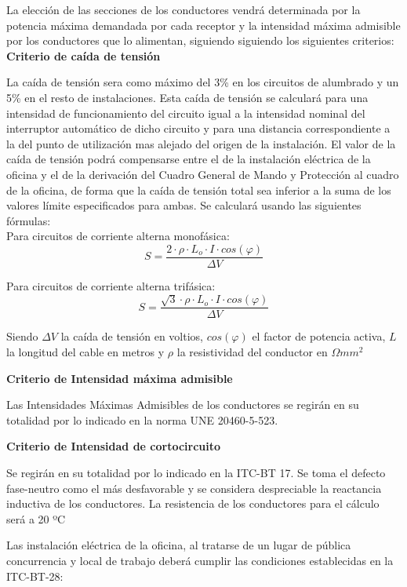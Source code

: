 La elección de las secciones de los conductores vendrá determinada por la potencia máxima demandada por cada receptor y la intensidad máxima admisible por los conductores que lo alimentan, siguiendo siguiendo los siguientes criterios:\\

{\bfseries Criterio de caída de tensión}

La caída de tensión sera como máximo del 3\% en los circuitos de alumbrado y un 5\% en el resto de instalaciones. Esta caída de tensión se calculará para una intensidad de funcionamiento del circuito igual a la intensidad nominal del interruptor automático de dicho circuito y para una distancia correspondiente a la del punto de utilización mas alejado del origen de la instalación. El valor de la caída de tensión podrá compensarse entre el de la instalación eléctrica de la oficina y el de la derivación del Cuadro General de Mando y Protección al cuadro de la oficina, de forma que la caída de tensión total sea inferior a la suma de los valores límite especificados para ambas. Se calculará usando las siguientes fórmulas:\\

Para circuitos de corriente alterna monofásica:\\

$$ S=\frac{2\cdot \rho \cdot L_o	\cdot I\cdot cos(\varphi)}{\Delta V}$$

Para circuitos de corriente alterna trifásica:\\

$$ S=\frac{\sqrt{3} \cdot \rho \cdot L_o \cdot I\cdot cos(\varphi)}{\Delta V}$$

Siendo $\Delta V$ la caída de tensión en voltios, $cos(\varphi)$ el factor de potencia activa, $L$ la longitud del cable en metros y $\rho$ la resistividad del conductor en $\Omega mm^2$


{\bfseries Criterio de Intensidad máxima admisible}

Las Intensidades Máximas Admisibles de los conductores se regirán en su totalidad por lo indicado en la norma UNE 20460-5-523.

{\bfseries Criterio de Intensidad de cortocircuito}

Se regirán en su totalidad por lo indicado en la ITC-BT 17. Se toma el defecto fase-neutro como el más desfavorable y se considera despreciable la reactancia inductiva de los conductores. La resistencia de los conductores para el cálculo será a 20 ºC 

Las instalación eléctrica de la oficina, al tratarse de un lugar de pública concurrencia y local de trabajo deberá cumplir las condiciones establecidas en la ITC-BT-28: \\

